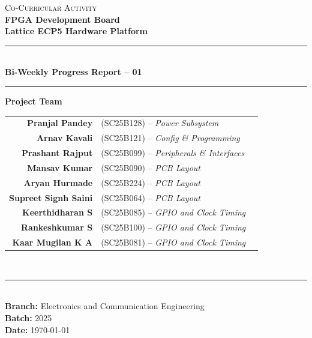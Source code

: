 \documentclass[12pt,a4paper]{article}
\begin{document}
\begin{titlepage}
    \vspace*{2.5cm}

    \begin{center}
        {\Large \textsc{Co-Curricular Activity}}\\[0.8cm]
        {\huge \textbf{FPGA Development Board}}\\[0.3cm]
        {\large \textbf{Lattice ECP5 Hardware Platform}}\\[1.2cm]
        \rule{0.6\textwidth}{0.8pt}\\[0.6cm]
        {\LARGE \textbf{Bi-Weekly Progress Report -- 01}}\\[0.6cm]
        \rule{0.6\textwidth}{0.8pt}
    \end{center}

    \vfill
    \begin{center}
        \begin{minipage}{0.58\textwidth}
            \center
            \textbf{\large Project Team}\\[0.25cm]
            \small
            \begin{tabular}{r l r}
                \textbf{Pranjal Pandey}      & (SC25B128) -- \textit{Power Subsystem} \\
                \textbf{Arnav Kavali}        & (SC25B121) -- \textit{Config \& Programming} \\
                \textbf{Prashant Rajput}     & (SC25B099) -- \textit{Peripherals \& Interfaces} \\
                \textbf{Mansav Kumar}        & (SC25B090) -- \textit{PCB Layout} \\
                \textbf{Aryan Hurmade}       & (SC25B224) -- \textit{PCB Layout} \\
                \textbf{Supreet Signh Saini} & (SC25B064) -- \textit{PCB Layout} \\
                \textbf{Keerthidharan S}     & (SC25B085) -- \textit{GPIO and Clock Timing} \\
                \textbf{Rankeshkumar S}      & (SC25B100) -- \textit{GPIO and Clock Timing} \\
                \textbf{Kaar Mugilan K A}    & (SC25B081) -- \textit{GPIO and Clock Timing} \\
                
            \end{tabular}\\[0.4cm]
            \rule{\linewidth}{0.4pt}\\[0.2cm]
            \footnotesize
            \textbf{Branch:} Electronics and Communication Engineering\\
            \textbf{Batch:} 2025\\
            \textbf{Date:} \today
        \end{minipage}
    \end{center}

    \vspace*{1cm}
\end{titlepage}
\end{document}
